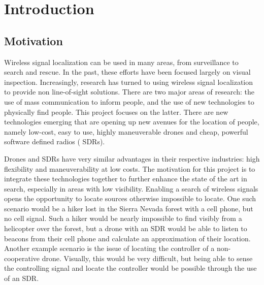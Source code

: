 \chapter{Introduction}

\section{Motivation}
Wireless signal localization can be used in many areas, from surveillance to search and rescue. In the past, these efforts have been focused largely on visual inspection. Increasingly, research has turned to using wireless signal localization to provide non line-of-sight solutions. There are two major areas of research: the use of mass communication to inform people, and the use of new technologies to physically find people. This project focuses on the latter. There are new technologies emerging that are opening up new avenues for the location of people, namely low-cost, easy to use, highly maneuverable drones and cheap, powerful software defined radios ( SDRs). \par
Drones and SDRs have very similar advantages in their respective industries: high flexibility and maneuverability at low costs. The motivation for this project is to integrate these technologies together to further enhance the state of the art in search, especially in areas with low visibility. Enabling a search of wireless signals opens the opportunity to locate sources otherwise impossible to locate. One such scenario would be a hiker lost in the Sierra Nevada forest with a cell phone, but no cell signal. Such a hiker would be nearly impossible to find visibly from a helicopter over the forest, but a drone with an SDR would be able to listen to beacons from their cell phone and calculate an approximation of their location. Another example scenario is the issue of locating the controller of a non-cooperative drone. Visually, this would be very difficult, but being able to sense the controlling signal and locate the controller would be possible through the use of an SDR.\par
